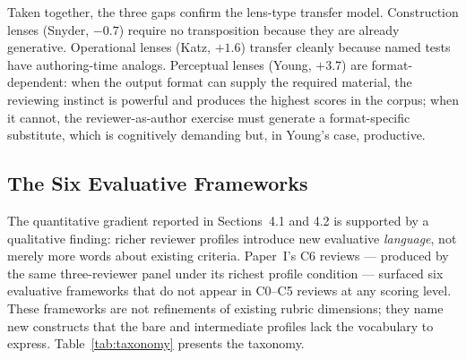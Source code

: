 Taken together, the three gaps confirm the lens-type transfer model. Construction lenses (Snyder, $-0.7$) require no transposition because they are already generative. Operational lenses (Katz, $+1.6$) transfer cleanly because named tests have authoring-time analogs. Perceptual lenses (Young, $+3.7$) are format-dependent: when the output format can supply the required material, the reviewing instinct is powerful and produces the highest scores in the corpus; when it cannot, the reviewer-as-author exercise must generate a format-specific substitute, which is cognitively demanding but, in Young's case, productive.

\subsection{The Six Evaluative Frameworks}

The quantitative gradient reported in Sections~4.1 and 4.2 is supported by a qualitative finding: richer reviewer profiles introduce new evaluative \emph{language}, not merely more words about existing criteria. Paper~I's C6 reviews --- produced by the same three-reviewer panel under its richest profile condition --- surfaced six evaluative frameworks that do not appear in C0--C5 reviews at any scoring level. These frameworks are not refinements of existing rubric dimensions; they name new constructs that the bare and intermediate profiles lack the vocabulary to express. Table~\ref{tab:taxonomy} presents the taxonomy.

